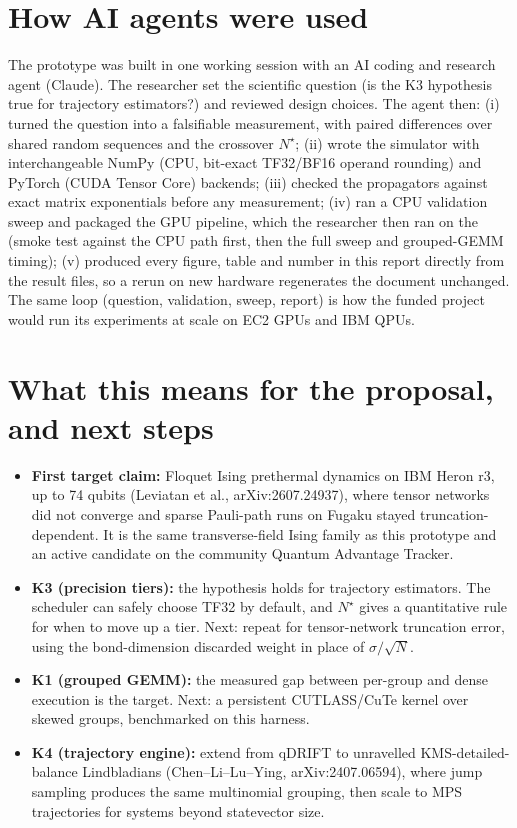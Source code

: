 \documentclass[10pt]{article}
\begin{document}

\section{How AI agents were used}
The prototype was built in one working session with an AI coding and research agent (Claude). The researcher set the scientific question (is the K3 hypothesis true for trajectory estimators?) and reviewed design choices. The agent then:
(i) turned the question into a falsifiable measurement, with paired differences over shared random sequences and the crossover $N^\star$;
(ii) wrote the simulator with interchangeable NumPy (CPU, bit-exact TF32/BF16 operand rounding) and PyTorch (CUDA Tensor Core) backends;
(iii) checked the propagators against exact matrix exponentials before any measurement;
(iv) ran a CPU validation sweep and packaged the GPU pipeline, which the researcher then ran on the \Device{} (smoke test against the CPU path first, then the full sweep and grouped-GEMM timing);
(v) produced every figure, table and number in this report directly from the result files, so a rerun on new hardware regenerates the document unchanged.
The same loop (question, validation, sweep, report) is how the funded project would run its experiments at scale on EC2 GPUs and IBM QPUs.

\section{What this means for the proposal, and next steps}
\begin{itemize}
\item \textbf{First target claim:} Floquet Ising prethermal dynamics on IBM Heron r3, up to 74 qubits (Leviatan et al., arXiv:2607.24937), where tensor networks did not converge and sparse Pauli-path runs on Fugaku stayed truncation-dependent. It is the same transverse-field Ising family as this prototype and an active candidate on the community Quantum Advantage Tracker.
\item \textbf{K3 (precision tiers):} the hypothesis holds for trajectory estimators. The scheduler can safely choose TF32 by default, and $N^\star$ gives a quantitative rule for when to move up a tier. Next: repeat for tensor-network truncation error, using the bond-dimension discarded weight in place of $\sigma/\sqrt N$.
\item \textbf{K1 (grouped GEMM):} the measured gap between per-group and dense execution is the target. Next: a persistent CUTLASS/CuTe kernel over skewed groups, benchmarked on this harness.
\item \textbf{K4 (trajectory engine):} extend from qDRIFT to unravelled KMS-detailed-balance Lindbladians (Chen--Li--Lu--Ying, arXiv:2407.06594), where jump sampling produces the same multinomial grouping, then scale to MPS trajectories for systems beyond statevector size.
\end{itemize}
\CodeLine
\end{document}
